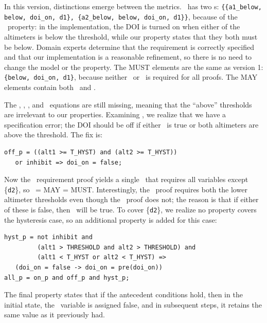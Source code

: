 \noindent In this version, distinctions emerge between the metrics.  \allp\ has two \mivc s: \texttt{\{\{a1\_below, below, doi\_on, d1\}, \{a2\_below, below, doi\_on, d1\}\}}, because of the \onp\ property: in the implementation, the DOI is turned on when either of the altimeters is below the threshold, while our property states that they both must be below.
Domain experts determine that the requirement is correctly specified and that our implementation is a reasonable refinement, so there is no need to change the model or the property.  The MUST elements are the same as version 1: \texttt{\{below, doi\_on, d1\}}, because neither \aonebelow\ or \atwobelow\ is required for all proofs.  %
The MAY elements contain both \aonebelow\ and \atwobelow.

The \abovehyst, \aoneabove, \atwoabove, and \dtwo\ equations are still missing, meaning that the ``above'' thresholds are irrelevant to our properties.  Examining \offp, we realize that we have a specification error; the DOI should be off if either \inhibit\ is true or both altimeters are above the threshold. The fix is:

{\smaller
\begin{verbatim}
off_p = ((alt1 >= T_HYST) and (alt2 >= T_HYST))
   or inhibit => doi_on = false;
\end{verbatim}
}

\noindent Now the \allp\ requirement proof yields a single \mivc ~that requires all variables except \{\texttt{d2}\}, so \mivc ~= MAY = MUST.  Interestingly, the \offp\ proof requires both the lower altimeter thresholds even though the \onp\ proof does not; the reason is that if either of these is false, then \doion\ will be true.  To cover \{\texttt{d2}\}, we realize no property covers the hysteresis case, so an additional property is added for this case:

{\smaller
\begin{verbatim}
hyst_p = not inhibit and
         (alt1 > THRESHOLD and alt2 > THRESHOLD) and
         (alt1 < T_HYST or alt2 < T_HYST) =>
   (doi_on = false -> doi_on = pre(doi_on))
all_p = on_p and off_p and hyst_p;
\end{verbatim}
}
\noindent The final property states that if the antecedent conditions hold, then in the initial state, the \doion\ variable is assigned false, and in subsequent steps, it retains the same value as it previously had.

